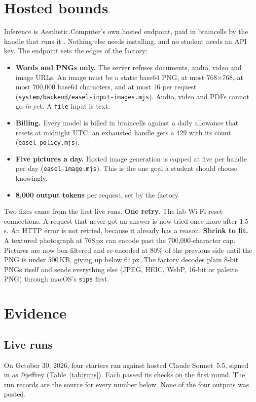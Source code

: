 \documentclass[10pt,letterpaper,twocolumn]{article}
\newcommand{\acdot}{{\color{acpink}.}}
\newcommand{\ac}{Aesthetic{\acdot}Computer}
\newcommand{\code}[1]{\texttt{#1}}
\begin{document}
\section{Hosted bounds}
\label{sec:bounds}

Inference is \ac{}'s own hosted endpoint, paid in braincells by the handle
that runs it \citep{scudder2026strangers}. Nothing else needs installing,
and no student needs an API key. The endpoint sets the edges of the factory:
\begin{itemize}
\item \textbf{Words and PNGs only.} The server refuses documents, audio,
video and image URLs. An image must be a static base64 PNG, at most
768$\times$768, at most 700,000 base64 characters, and at most 16 per request
(\code{system/backend/easel-input-images.mjs}). Audio, video and PDFs cannot go
\emph{in} yet. A \code{file} input is text.
\item \textbf{Billing.} Every model is billed in braincells against a daily
allowance that resets at midnight UTC; an exhausted handle gets a 429 with
its count (\code{easel-policy.mjs}).
\item \textbf{Five pictures a day.} Hosted image generation is capped at five
per handle per day (\code{easel-image.mjs}). This
is the one goal a student should choose knowingly.
\item \textbf{8,000 output tokens} per request, set by the factory.
\end{itemize}

Two fixes came from the first live runs. \textbf{One retry.} The lab Wi-Fi
reset connections. A request that never got an answer is now tried once more
after 1.5\,s. An HTTP error is not retried, because it already has a reason.
\textbf{Shrink to fit.} A textured photograph at 768\,px can encode past the
700,000-character cap. Pictures are now box-filtered and re-encoded at 80\%
of the previous side until the PNG is under 500\,KB, giving up below 64\,px. The
factory decodes plain 8-bit PNGs itself and sends everything else (JPEG,
HEIC, WebP, 16-bit or palette PNG) through macOS's \code{sips} first.

\section{Evidence}
\label{sec:evidence}

\subsection{Live runs}
On October 30, 2026, four starters ran against hosted Claude Sonnet~5.5,
signed in as @jeffrey (Table~\ref{tab:runs}). Each passed its checks on the
first round. The run records are the source for every number below. None of
the four outputs was posted.
\end{document}
